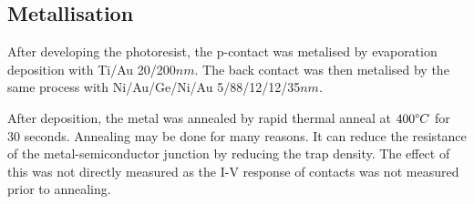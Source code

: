 \subsection{Metallisation}
\label{sec:fab:metallisation}


After developing the photoresist, the p-contact was metalised by evaporation deposition with Ti/Au 20/200$nm$. The back contact was then metalised by the same process with Ni/Au/Ge/Ni/Au 5/88/12/12/35$nm$.

After deposition, the metal was annealed by rapid thermal anneal at $400\degree C$ for 30 seconds. Annealing may be done for many reasons. It can reduce the resistance of the metal-semiconductor junction by reducing the trap density. The effect of this was not directly measured as the I-V response of contacts was not measured prior to annealing.
